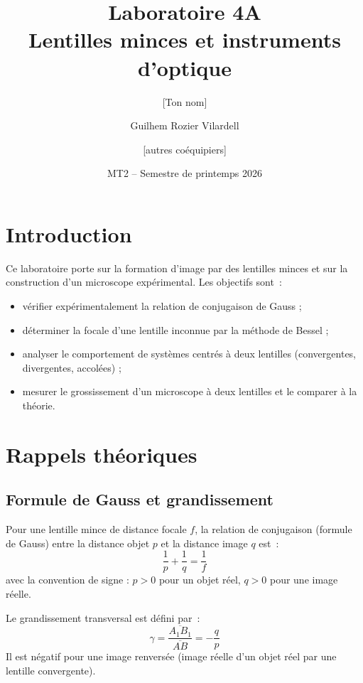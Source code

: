 ﻿\documentclass[a4paper, 11pt]{article}
\title{\textbf{Laboratoire 4A}\\[4pt]
       \large Lentilles minces et instruments d'optique}
\author{[Ton nom] \and Guilhem Rozier Vilardell \and [autres coéquipiers]}
\date{MT2 -- Semestre de printemps 2026}
\begin{document}
\maketitle
\tableofcontents
\newpage

\section{Introduction}

Ce laboratoire porte sur la formation d'image par des lentilles minces et sur la construction d'un microscope expérimental. Les objectifs sont~:
\begin{itemize}
  \item vérifier expérimentalement la relation de conjugaison de Gauss ;
  \item déterminer la focale d'une lentille inconnue par la méthode de Bessel ;
  \item analyser le comportement de systèmes centrés à deux lentilles (convergentes, divergentes, accolées) ;
  \item mesurer le grossissement d'un microscope à deux lentilles et le comparer à la théorie.
\end{itemize}

\section{Rappels théoriques}

\subsection{Formule de Gauss et grandissement}

Pour une lentille mince de distance focale $f$, la relation de conjugaison (formule de Gauss) entre la distance objet $p$ et la distance image $q$ est~:
\begin{equation}
  \frac{1}{p} + \frac{1}{q} = \frac{1}{f}
  \label{eq:gauss}
\end{equation}
avec la convention de signe : $p>0$ pour un objet réel, $q>0$ pour une image réelle.

Le grandissement transversal est défini par~:
\begin{equation}
  \gamma = \frac{\overline{A_1B_1}}{\overline{AB}} = -\frac{q}{p}
  \label{eq:grandissement}
\end{equation}
Il est négatif pour une image renversée (image réelle d'un objet réel par une lentille convergente).
\end{document}

